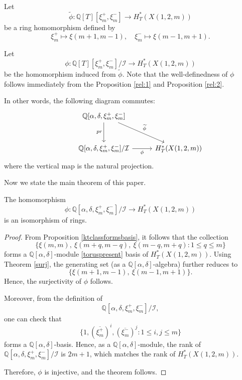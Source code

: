 \documentclass[10pt, a4paper, reqno]{amsart}
\begin{document}
Let 
\[
\widetilde{\phi}: \mathbb{Q}[T][\xi^+_m,\xi^-_m] \to H^*_T(X(1,2,m))
\] 
be a ring homomorphism defined by
\[
\xi^+_m \mapsto \xi(m+1,m-1), \quad \xi^-_m \mapsto \xi(m-1,m+1).
\]

Let
\begin{equation}\label{eq:phi_induced}
	\phi: \mathbb{Q}[T][\xi^+_m,\xi^-_m] /\mathcal{I} \to H^*_T(X(1,2,m))
\end{equation}
be the homomorphism induced from $\widetilde{\phi}$. Note that the well-definedness of $\phi$ follows immediately from the Proposition \ref{rel:1} and Proposition \ref{rel:2}.

In other words, the following diagram commutes:
\[
\begin{tikzcd}[row sep=1cm, column sep=1cm]
	&  \mathbb{Q}[\alpha, \delta, \xi^+_m,\xi^-_m] \arrow[d,"pr"'] \arrow[dr, "\widetilde{\phi}"] & \\
	&\mathbb{Q}[\alpha, \delta, \xi^+_m,\xi^-_m] /\mathcal{I} \arrow[r, "\phi"'] & H^*_T(X(1,2,m))
\end{tikzcd}
\]
where the vertical map is the natural projection.

Now we state the main theorem of this paper.


\begin{guess}\label{theo:main_cqG}
	The homomorphism 
	\[
	\phi:\mathbb{Q}[\alpha, \delta, \xi^+_m,\xi^-_m] /\mathcal{I} \longrightarrow H^*_T(X(1,2,m))
	\] 
	is an isomorphism of rings.
\end{guess}


\begin{proof}
	From Proposition \ref{ktclassformsbasis}, it follows that the collection
	\[
	\Big\{\xi(m,m),~\xi(m+q,m-q),~\xi(m-q,m+q) : 1 \le q \le m\Big\}
	\]
	forms a $\mathbb{Q}[\alpha,\delta]$-module \eqref{toruspresent} basis of $H^*_T(X(1,2,m))$. Using Theorem \ref{surj}, the  generating set (as a $\mathbb{Q}[\alpha,\delta]$-algebra) further reduces to
	\[
	\{\xi(m+1,m-1),~\xi(m-1,m+1)\}.
	\]
	Hence, the surjectivity of $\phi$ follows.
	
	
	Moreover, from the definition of 
	\[
	\mathbb{Q}[\alpha,\delta, \xi^+_m,\xi^-_m] / \mathcal{I},
	\]
	one can check that
	\[
	\{1, (\overline{\xi^+_m})^i, (\overline{\xi^-_m})^j : 1 \le i,j \le m\}
	\]
	forms a $\mathbb{Q}[\alpha,\delta]$-basis.  Hence, as a $\mathbb{Q}[\alpha,\delta]$-module, the rank of $\mathbb{Q}[\alpha,\delta, \xi^+_m,\xi^-_m] / \mathcal{I}$ is $2m+1$, which matches the rank of $H^*_T(X(1,2,m))$. %
	
	Therefore, $\phi$ is injective, and the theorem follows.
\end{proof}
\end{document}
